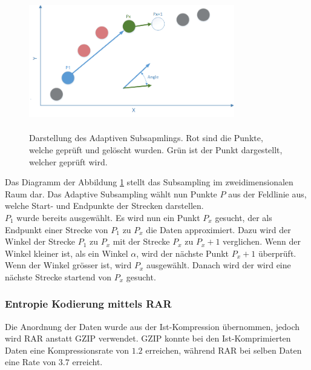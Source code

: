 \begin{figure}[!htbp]
	\center
	\includegraphics[width=0.8\textwidth,height=6cm,keepaspectratio]{./pictures/konzept/solution0/anglesubsampling.png}
	\caption{Darstellung des Adaptiven Subsapmlings. Rot sind die Punkte, welche geprüft und gelöscht wurden. Grün ist der Punkt dargestellt, welcher geprüft wird.}
	\label{konzept:loesung0:angle}
\end{figure}
Das Diagramm der Abbildung \ref{konzept:loesung0:angle} stellt das Subsampling im zweidimensionalen Raum dar. Das Adaptive Subsampling wählt nun Punkte $P$ aus der Feldlinie aus, welche Start- und Endpunkte der Strecken darstellen.\\
$P_1$ wurde bereits ausgewählt. Es wird nun ein Punkt $P_x$ gesucht, der als Endpunkt einer Strecke von $P_1$ zu $P_x$ die Daten approximiert. Dazu wird der Winkel der Strecke $P_1$ zu $P_x$ mit der Strecke $P_x$ zu $P_x+1$ verglichen. Wenn der Winkel kleiner ist, als ein Winkel $\alpha$, wird der nächste Punkt $P_x+1$ überprüft. Wenn der Winkel grösser ist, wird $P_x$ ausgewählt. Danach wird der wird eine nächste Strecke startend von $P_x$ gesucht.

\subsubsection{Entropie Kodierung mittels RAR} \label{konzept:loesung0:kodierung}
Die Anordnung der Daten wurde aus der Ist-Kompression übernommen, jedoch wird RAR anstatt GZIP verwendet. GZIP konnte bei den Ist-Komprimierten Daten eine Kompressionsrate von $1.2$ erreichen, während RAR bei selben Daten eine Rate von $3.7$ erreicht.
\pagebreak

